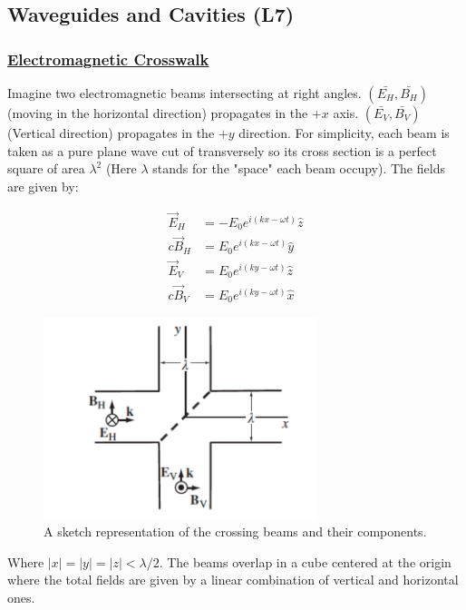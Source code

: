 \subsection{Waveguides and Cavities \textbf{(L7)}}

 \subsubsection{\hyperref[Electromagnetic Crosswalk]{Electromagnetic Crosswalk}}
 
Imagine two electromagnetic beams intersecting at right angles. $(\bar{E_{H}},\bar{B_{H}})$ (moving in the horizontal direction) propagates in the $+x$ axis. $(\bar{E_{V}},\bar{B_{V}})$ (Vertical direction) propagates in the $+y$ direction. For simplicity, each beam is taken as a pure plane wave cut of transversely so its cross section is a perfect square of area $\lambda^{2}$ (Here $\lambda$ stands for the "space" each beam occupy). The fields are given by:
	
\begin{subequations}
\begin{align}
\vec{E}_{H} &= -E_{0} e^{i(kx - \omega t)} \hat{z}\\
c \vec{B}_{H} &= E_{0} e^{i(kx - \omega t)} \hat{y}\\
\vec{E}_{V} &= E_{0} e^{i(ky - \omega t)} \hat{z}\\
c \vec{B}_{V} &= E_{0} e^{i(ky - \omega t)} \hat{x}
\end{align}
\end{subequations}

\begin{figure}[h]
	\includegraphics[width=8cm]{figures/crossbeams.png}
	\centering
	\caption{A sketch representation of the crossing beams and their components.}
\end{figure}

Where $\left|x\right|=\left|y\right|=\left|z\right|< \lambda/2$. The beams overlap in a cube centered at the origin where the total fields are given by a linear combination of vertical and horizontal ones.

